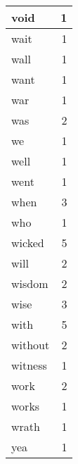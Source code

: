\begin{center}
\begin{longtable}{l|r}
void & 1\\ \hline 
wait & 1\\ \hline 
wall & 1\\ \hline 
want & 1\\ \hline 
war & 1\\ \hline 
was & 2\\ \hline 
we & 1\\ \hline 
well & 1\\ \hline 
went & 1\\ \hline 
when & 3\\ \hline 
who & 1\\ \hline 
wicked & 5\\ \hline 
will & 2\\ \hline 
wisdom & 2\\ \hline 
wise & 3\\ \hline 
with & 5\\ \hline 
without & 2\\ \hline 
witness & 1\\ \hline 
work & 2\\ \hline 
works & 1\\ \hline 
wrath & 1\\ \hline 
yea & 1\\ \hline 
\end{longtable}  
\end{center}  


  
\normalsize  

  
  
